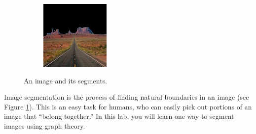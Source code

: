\begin{figure}
\begin{subfigure}{0.31\textwidth}
    \end{subfigure}
    \hspace*{\fill}
    \begin{subfigure}{0.31\textwidth}
        \includegraphics[width=\textwidth]{PosMon.png}
    \end{subfigure}
    
\caption{An image and its segments.}
\label{fig:monument}
\end{figure}
Image segmentation is the process of finding natural boundaries in an image (see Figure \ref{fig:monument}).
This is an easy task for humans, who can easily pick out portions of an image that ``belong together.''
In this lab, you will learn one way to segment images using graph theory.


